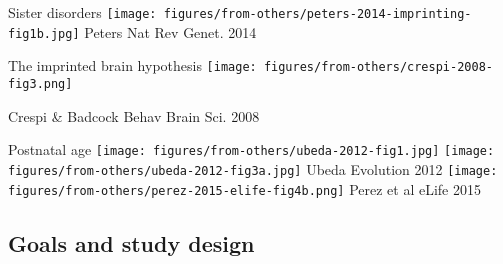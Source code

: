 \documentclass{beamer}
\begin{document}
\begin{frame}[t]{Sister disorders}
\texttt{[image: figures/from-others/peters-2014-imprinting-fig1b.jpg]}
{\tiny Peters Nat Rev Genet. 2014}

\end{frame}

\begin{frame}{The imprinted brain hypothesis}
\texttt{[image: figures/from-others/crespi-2008-fig3.png]}
\vfill
{\tiny \raggedright{Crespi \& Badcock Behav Brain Sci. 2008}}
\end{frame}

\begin{frame}{Postnatal age}
\texttt{[image: figures/from-others/ubeda-2012-fig1.jpg]}
\hfill
\texttt{[image: figures/from-others/ubeda-2012-fig3a.jpg]}
{\tiny Ubeda Evolution 2012}
\vfill
\texttt{[image: figures/from-others/perez-2015-elife-fig4b.png]}
{\tiny Perez et al eLife 2015}
\end{frame}

\subsection{Goals and study design}
\end{document}
